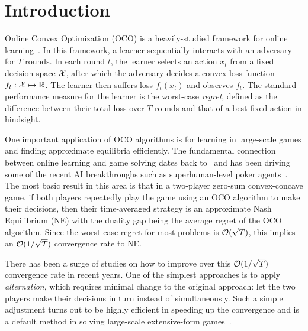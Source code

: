 \section{Introduction}
\label{intro}

Online Convex Optimization (OCO) is a heavily-studied framework for online learning~\citep{zinkevich2003online}.
In this framework, a learner sequentially interacts with an adversary for $T$ rounds.
In each round $t$, the learner selects an action $x_t$ from a fixed decision space ${\mathcal{X}}$,
after which the adversary decides a convex loss function $f_t: {\mathcal{X}}\mapsto \mathbb{R}$.
The learner then suffers loss $f_t(x_t)$ and observes $f_t$.
The standard performance measure for the learner is the worst-case \emph{regret}, defined as the difference between their total loss over $T$ rounds and that of a best fixed action in hindsight.

One important application of OCO algorithms is for learning in large-scale games and finding approximate equilibria efficiently.
The fundamental connection between online learning and game solving dates back to~\citep{foster1997calibrated,freund1999adaptive, hart2000simple} and has been driving some of the recent AI breakthroughs such as superhuman-level poker agents~\citep{bowling2015heads, moravvcik2017deepstack, brown2018superhuman, brown2019superhuman}.
The most basic result in this area is that in a two-player zero-sum convex-concave game, if both players repeatedly play the game using an OCO algorithm to make their decisions, then their time-averaged strategy is an approximate Nash Equilibrium (NE) with the duality gap being the average regret of the OCO algorithm. 
Since the worst-case regret for most problems is $\mathcal{O}(\sqrt{T})$, this implies an $\mathcal{O}(1/\sqrt{T})$ convergence rate to NE.

There has been a surge of studies on how to improve over this $\mathcal{O}(1/\sqrt{T})$ convergence rate in recent years.
One of the simplest approaches is to apply \textit{alternation}, which requires minimal change to the original approach: let the two players make their decisions in turn instead of simultaneously.
Such a simple adjustment turns out to be highly efficient in speeding up the convergence and is a default method in solving large-scale extensive-form games~\citep{tammelin2014solving}.

